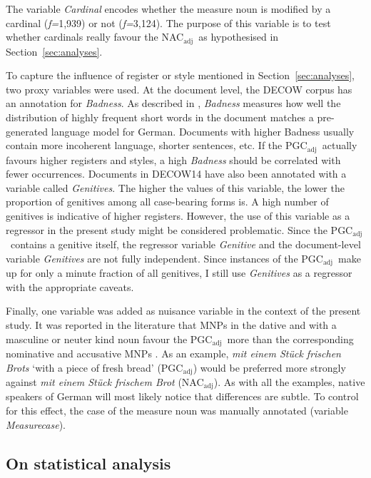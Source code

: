 \documentclass[USenglish]{article}
\newcommand{\Sub}[1]{\ensuremath{\mathrm{_{#1}}}}
\newcommand{\NACa}{NAC\Sub{adj}}
\newcommand{\PGCa}{PGC\Sub{adj}}
\begin{document}
The variable \textit{Cardinal} encodes whether the measure noun is modified by a cardinal (\textit{f=}1,939) or not (\textit{f=}3,124).
The purpose of this variable is to test whether cardinals really favour the \NACa\ as hypothesised in Section~\ref{sec:analyses}.

To capture the influence of register or style mentioned in Section~\ref{sec:analyses}, two proxy variables were used.
At the document level, the DECOW corpus has an annotation for \textit{Badness}.
As described in \cite{SchaeferEa2013}, \textit{Badness} measures how well the distribution of highly frequent short words in the document matches a pre-generated language model for German.
Documents with higher Badness usually contain more incoherent language, shorter sentences, etc.
If the \PGCa\ actually favours higher registers and styles, a high \textit{Badness} should be correlated with fewer occurrences.
Documents in DECOW14 have also been annotated with a variable called \textit{Genitives}.
The higher the values of this variable, the lower the proportion of genitives among all case-bearing forms is.
A high number of genitives is indicative of higher registers.
However, the use of this variable as a regressor in the present study might be considered problematic.
Since the \PGCa\ contains a genitive itself, the regressor variable \textit{Genitive} and the document-level variable \textit{Genitives} are not fully independent.
Since instances of the \PGCa\ make up for only a minute fraction of all genitives, I still use \textit{Genitives} as a regressor with the appropriate caveats.

Finally, one variable was added as nuisance variable in the context of the present study.
It was reported in the literature that MNPs in the dative and with a masculine or neuter kind noun favour the \PGCa\ more than the corresponding nominative and accusative MNPs \citep{Hentschel1993,Zimmer2015}.
As an example, \textit{mit einem Stück frischen Brots} `with a piece of fresh bread' (\PGCa) would be preferred more strongly against \textit{mit einem Stück frischem Brot} (\NACa).
As with all the examples, native speakers of German will most likely notice that differences are subtle.
To control for this effect, the case of the measure noun was manually annotated (variable \textit{Measurecase}).



\subsection{On statistical analysis}
\label{sec:rightstatistics}
\end{document}
